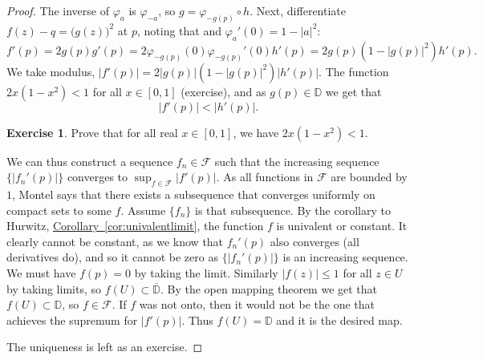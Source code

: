 \documentclass[12pt,openany]{book}
\newcommand{\sabs}[1]{\lvert {#1} \rvert}
\newcommand{\D}{{\mathbb{D}}}
\newcommand{\sF}{{\mathscr{F}}}
\theoremstyle{plain}
\theoremstyle{remark}
\theoremstyle{definition}
\newenvironment{exbox}{%
    \def\FrameCommand{\vrule width 1pt \relax\hspace{10pt}}%
    \MakeFramed{\advance\hsize-\width\FrameRestore}%
}{%
    \endMakeFramed
}
\theoremstyle{exercise}
\newtheorem{exercise}{Exercise}[section]
\theoremstyle{example}
\newcommand{\corref}[1]{\hyperref[#1]{Corollary~\ref*{#1}}}
\begin{document}
\begin{proof}
The inverse of $\varphi_a$ is $\varphi_{-a}$, so
$g = \varphi_{-g(p)} \circ h$.
Next, differentiate
$f(z)-q = {\bigl(g(z)\bigr)}^2$ at $p$, noting that
and $\varphi_a'(0) = 1-\sabs{a}^2$:
\begin{equation*}
f'(p) = 2 g(p) g'(p) = 2 \varphi_{-g(p)} (0) \varphi_{-g(p)}'(0) h'(p)  =
2 g(p) (1-\sabs{g(p)}^2) h'(p) .
\end{equation*}
We take modulus,
$\sabs{f'(p)} = 2 \sabs{g(p)} (1-\sabs{g(p)}^2) \sabs{h'(p)}$.  The function
$2x(1-x^2) < 1$ for all $x \in [0,1]$ (exercise), and as $g(p) \in \D$ we get that
\begin{equation*}
\sabs{f'(p)} < \sabs{h'(p)} .
\end{equation*}
\begin{exbox}
\begin{exercise}
Prove that for all real $x \in [0,1]$, we have $2x(1-x^2) < 1$.
\end{exercise}
\end{exbox}

We can thus construct a sequence $f_n \in \sF$ such that the increasing sequence
$\bigl\{ \sabs{f_n'(p)} \bigr\}$ converges to $\sup_{f \in \sF}
\sabs{f'(p)}$.  As all functions in $\sF$ are bounded by $1$,
Montel says that there exists a subsequence that converges uniformly on
compact sets to some $f$.  Assume $\{ f_n \}$ is that subsequence.
By the corollary to Hurwitz,
\corref{cor:univalentlimit},
the function $f$ is univalent or constant.  It clearly cannot be constant,
as we know that $f_n'(p)$ also converges (all derivatives do), and so it
cannot be zero as 
$\bigl\{ \sabs{f_n'(p)} \bigr\}$ is an increasing sequence.
We must have $f(p) = 0$ by taking the limit.
Similarly 
$\sabs{f(z)} \leq 1$ for all $z \in U$ by taking limits,
so $f(U) \subset \overline{\D}$.
By the open mapping theorem we get that $f(U) \subset \D$, so $f \in
\sF$.  If $f$ was not onto, then it would not be the one that achieves the
supremum for $\sabs{f'(p)}$.  Thus $f(U) = \D$ and it is the desired map.

The uniqueness is left as an exercise.
\end{proof}
\end{document}
